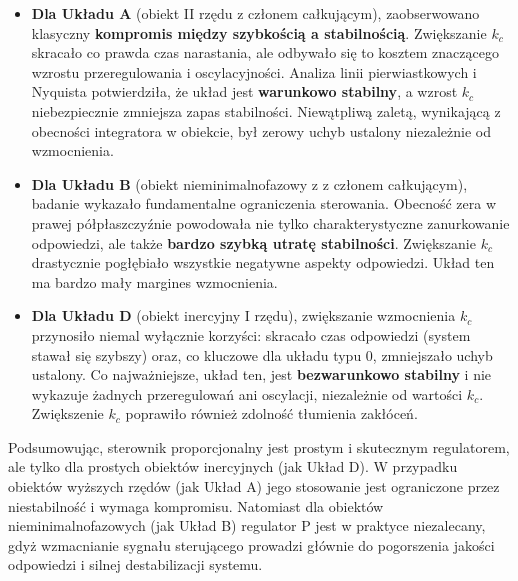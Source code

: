\documentclass[12pt,a4paper]{article}
\begin{document}
	\begin{itemize}
		
		\item \textbf{Dla Układu A} (obiekt II rzędu z członem całkującym), zaobserwowano klasyczny \textbf{kompromis między szybkością a stabilnością}. Zwiększanie $k_c$ skracało co prawda czas narastania, ale odbywało się to kosztem znaczącego wzrostu przeregulowania i oscylacyjności. Analiza linii pierwiastkowych i Nyquista potwierdziła, że układ jest \textbf{warunkowo stabilny}, a wzrost $k_c$ niebezpiecznie zmniejsza zapas stabilności. Niewątpliwą zaletą, wynikającą z obecności integratora w obiekcie, był zerowy uchyb ustalony niezależnie od wzmocnienia.
		
		\item \textbf{Dla Układu B} (obiekt nieminimalnofazowy z z członem całkującym), badanie wykazało fundamentalne ograniczenia sterowania. Obecność zera w prawej półpłaszczyźnie powodowała nie tylko charakterystyczne zanurkowanie odpowiedzi, ale także \textbf{bardzo szybką utratę stabilności}. Zwiększanie $k_c$ drastycznie pogłębiało wszystkie negatywne aspekty odpowiedzi. Układ ten ma bardzo mały margines wzmocnienia.
		
		\item \textbf{Dla Układu D} (obiekt inercyjny I rzędu), zwiększanie wzmocnienia $k_c$ przynosiło niemal wyłącznie korzyści: skracało czas odpowiedzi (system stawał się szybszy) oraz, co kluczowe dla układu typu 0, zmniejszało uchyb ustalony. Co najważniejsze, układ ten, jest \textbf{bezwarunkowo stabilny} i nie wykazuje żadnych przeregulowań ani oscylacji, niezależnie od wartości $k_c$. Zwiększenie $k_c$ poprawiło również zdolność tłumienia zakłóceń.
		
	\end{itemize}
	
	Podsumowując, sterownik proporcjonalny jest prostym i skutecznym regulatorem, ale tylko dla prostych obiektów inercyjnych (jak Układ D). W przypadku obiektów wyższych rzędów (jak Układ A) jego stosowanie jest ograniczone przez niestabilność i wymaga kompromisu. Natomiast dla obiektów nieminimalnofazowych (jak Układ B) regulator P jest w praktyce niezalecany, gdyż wzmacnianie sygnału sterującego prowadzi głównie do pogorszenia jakości odpowiedzi i silnej destabilizacji systemu.
	
\end{document}
